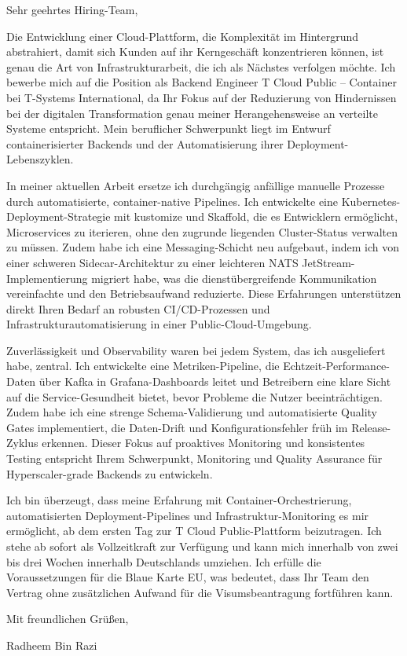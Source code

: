 \documentclass[11pt,a4paper]{coverletter}
\begin{document}
\opening{Sehr geehrtes Hiring-Team,}

Die Entwicklung einer Cloud-Plattform, die Komplexität im Hintergrund abstrahiert, damit sich Kunden auf ihr Kerngeschäft konzentrieren können, ist genau die Art von Infrastrukturarbeit, die ich als Nächstes verfolgen möchte. Ich bewerbe mich auf die Position als Backend Engineer T Cloud Public – Container bei T-Systems International, da Ihr Fokus auf der Reduzierung von Hindernissen bei der digitalen Transformation genau meiner Herangehensweise an verteilte Systeme entspricht. Mein beruflicher Schwerpunkt liegt im Entwurf containerisierter Backends und der Automatisierung ihrer Deployment-Lebenszyklen.

In meiner aktuellen Arbeit ersetze ich durchgängig anfällige manuelle Prozesse durch automatisierte, container-native Pipelines. Ich entwickelte eine Kubernetes-Deployment-Strategie mit kustomize und Skaffold, die es Entwicklern ermöglicht, Microservices zu iterieren, ohne den zugrunde liegenden Cluster-Status verwalten zu müssen. Zudem habe ich eine Messaging-Schicht neu aufgebaut, indem ich von einer schweren Sidecar-Architektur zu einer leichteren NATS JetStream-Implementierung migriert habe, was die dienstübergreifende Kommunikation vereinfachte und den Betriebsaufwand reduzierte. Diese Erfahrungen unterstützen direkt Ihren Bedarf an robusten CI/CD-Prozessen und Infrastrukturautomatisierung in einer Public-Cloud-Umgebung.

Zuverlässigkeit und Observability waren bei jedem System, das ich ausgeliefert habe, zentral. Ich entwickelte eine Metriken-Pipeline, die Echtzeit-Performance-Daten über Kafka in Grafana-Dashboards leitet und Betreibern eine klare Sicht auf die Service-Gesundheit bietet, bevor Probleme die Nutzer beeinträchtigen. Zudem habe ich eine strenge Schema-Validierung und automatisierte Quality Gates implementiert, die Daten-Drift und Konfigurationsfehler früh im Release-Zyklus erkennen. Dieser Fokus auf proaktives Monitoring und konsistentes Testing entspricht Ihrem Schwerpunkt, Monitoring und Quality Assurance für Hyperscaler-grade Backends zu entwickeln.

Ich bin überzeugt, dass meine Erfahrung mit Container-Orchestrierung, automatisierten Deployment-Pipelines und Infrastruktur-Monitoring es mir ermöglicht, ab dem ersten Tag zur T Cloud Public-Plattform beizutragen. Ich stehe ab sofort als Vollzeitkraft zur Verfügung und kann mich innerhalb von zwei bis drei Wochen innerhalb Deutschlands umziehen. Ich erfülle die Voraussetzungen für die Blaue Karte EU, was bedeutet, dass Ihr Team den Vertrag ohne zusätzlichen Aufwand für die Visumsbeantragung fortführen kann.

\closing{Mit freundlichen Grüßen,}{Radheem Bin Razi}
\end{document}
